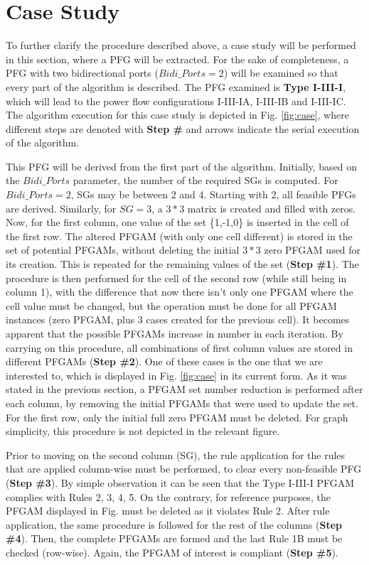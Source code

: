 \documentclass[conference]{IEEEtran}
\begin{document}
\section{Case Study}
To further clarify the procedure described above, a case study will be performed in this section, where a PFG will be extracted. For the sake of completeness, a PFG with two bidirectional ports ($Bidi\_Ports=2$) will be examined so that every part of the algorithm is described. The PFG examined is \textbf{Type I-III-I}, which will lead to the power flow configurations I-III-IA, I-III-IB and I-III-IC. The algorithm execution for this case study is depicted in Fig. \ref{fig:case}, where different steps are denoted with \textbf{Step \#} and arrows indicate the serial execution of the algorithm.

This PFG will be derived from the first part of the algorithm. Initially, based on the $Bidi\_Ports$ parameter, the number of the required SGs is computed. For $Bidi\_Ports=2$, SGs may be between 2 and 4. Starting with 2, all feasible PFGs are derived. Similarly, for $SG=3$, a $3*3$ matrix is created and filled with zeros. Now, for the first column, one value of the set \{1,-1,0\} is inserted in the cell of the first row. The altered PFGAM (with only one cell different) is stored in the set of potential PFGAMs, without deleting the initial $3*3$ zero PFGAM used for its creation. This is repeated for the remaining values of the set (\textbf{Step \#1}). The procedure is then performed for the cell of the second row (while still being in column 1), with the difference that now there isn't only one PFGAM where the cell value must be changed, but the operation must be done for all PFGAM instances (zero PFGAM, plus 3 cases created for the previous cell). It becomes apparent that the possible PFGAMs increase in number in each iteration. By carrying on this procedure, all combinations of first column values are stored in different PFGAMs (\textbf{Step \#2}). One of these cases is the one that we are interested to, which is displayed in Fig. \ref{fig:case} in its current form. As it was stated in the previous section, a PFGAM set number reduction is performed after each column, by removing the initial PFGAMs that were used to update the set. For the first row, only the initial full zero PFGAM must be deleted. For graph simplicity, this procedure is not depicted in the relevant figure.

Prior to moving on the second column (SG), the rule application for the rules that are applied column-wise must be performed, to clear every non-feasible PFG (\textbf{Step \#3}). By simple observation it can be seen that the Type I-III-I PFGAM complies with Rules 2, 3, 4, 5. On the contrary, for reference purposes, the PFGAM displayed in Fig. must be deleted as it violates Rule 2. After rule application, the same procedure is followed for the rest of the columns (\textbf{Step \#4}). Then, the complete PFGAMs are formed and the last Rule 1B must be checked (row-wise). Again, the PFGAM of interest is compliant (\textbf{Step \#5}).
\end{document}
